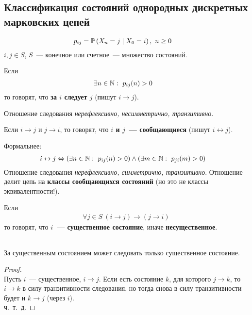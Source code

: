 \newpage
{}
\subsection{Классификация состояний однородных дискретных марковских цепей}
\begin{Des}
    \begin{align*}
      & p_{ij} = \mathbb{P} \left( X_n = j \mid X_0 = i \right), \ n \geq 0
    \end{align*}
    $i, j \in S$, $S$~--- конечное или счетное~--- множество состояний.
\end{Des}
\begin{Def}
    Если
    \begin{align*}
      & \exists n \in \mathbb{N}: \ p_{ij}(n) > 0
    \end{align*}
    то говорят, что \textbf{за $i$ следует $j$} (пишут $i \rightarrow j$).
\end{Def}
Отношение следования \textit{нерефлексивно, несимметрично, транзитивно}.
\begin{Def}
    Если $i \rightarrow j$ и $j \rightarrow i$, то говорят, что \textbf{$i$ и
      $j$~--- сообщающиеся} (пишут $i \leftrightarrow j$).
\end{Def}
Формальнее:
\begin{align*}
  & i \leftrightarrow j \Leftrightarrow \left( \exists n \in \NN: \ p_{ij}(n) > 0\right) \wedge \left( \exists m \in \NN: \ p_{ji}(m) > 0\right)
\end{align*}
Отношение следования \textit{нерефлексивно, симметрично, транзитивно}. Отношение
делит цепь на \textbf{классы сообщающихся состояний} (но это не классы
эквивалентности!).
\begin{Def}
    Если
    \begin{align*}
      \forall j \in S \ (i \rightarrow j) \rightarrow (j \rightarrow i)
    \end{align*}
    то говорят, что \textbf{$i$~--- существенное состояние}, иначе
    \textbf{несущественное}.
\end{Def}
\begin{theorem}
    ~
    \\
    За существенным состоянием может следовать только существенное состояние.
\end{theorem}
\begin{proof}
    ~
    \\
    Пусть $i$~--- существенное, $i \rightarrow j$. Если есть состояние $k$, для
    которого $j \rightarrow k$, то $i \rightarrow k$ в силу транзитивности
    следования, но тогда снова в силу транзитивности будет и $k \rightarrow j$
    (через $i$).
    \\
    ч.~т.~д.
\end{proof}
